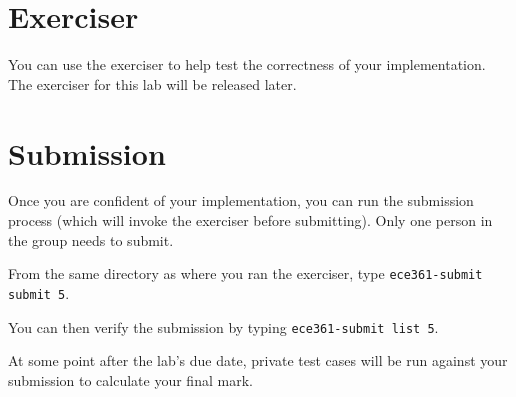 \documentclass[11pt]{article}
\def\thelab{5}
\begin{document}
\section{Exerciser}
\label{sec:exercise}
You can use the exerciser to help test the correctness of your implementation. The exerciser for this lab will be released later.




\section{Submission}
\label{sec:submission}
Once you are confident of your implementation, you can run the submission process (which will invoke the exerciser before submitting).
Only one person in the group needs to submit.

From the same directory as where you ran the exerciser, type \texttt{ece361-submit submit \thelab}.

You can then verify the submission by typing \texttt{ece361-submit list \thelab}.

At some point after the lab's due date, private test cases will be run against your submission to calculate your final mark.
\end{document}
